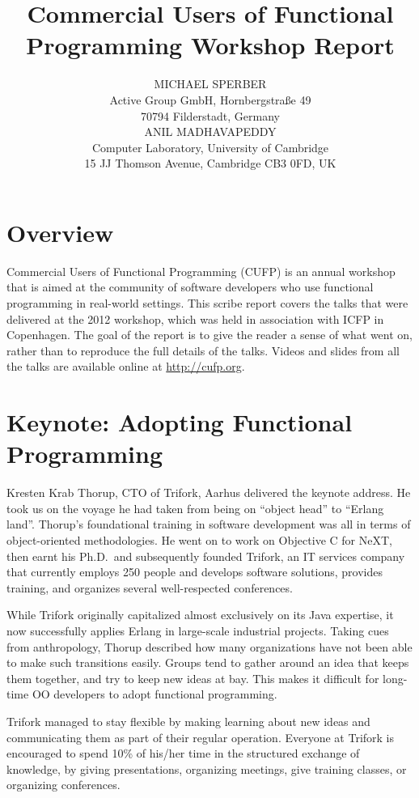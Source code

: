 \documentclass{jfp1}
\title[Commercial Users of Functional Programming 2012]
      {Commercial Users of Functional Programming Workshop Report}
\author[Michael Sperber and Anil Madhavapeddy]
       {MICHAEL SPERBER\\
         Active Group GmbH, Hornbergstra\ss{}e 49\\
         70794 Filderstadt, Germany\\
         ANIL MADHAVAPEDDY\\
        Computer Laboratory, University of Cambridge\\ 
        15 JJ Thomson Avenue, Cambridge CB3 0FD, UK}
\begin{document}
\label{firstpage}
\maketitle

\section{Overview}

Commercial Users of Functional Programming (CUFP) is an annual workshop
that is aimed at the community of software developers who use functional
programming in real-world settings.  This scribe report covers the talks
that were delivered at the 2012 workshop, which was held in association
with ICFP in Copenhagen.  The goal of the report is to give the reader
a sense of what went on, rather than to reproduce the full details
of the talks.  Videos and slides from all the talks are available online at \url{http://cufp.org}.

\section{Keynote: Adopting Functional Programming}

Kresten Krab Thorup, CTO of Trifork, Aarhus delivered the keynote address.
He took us on the voyage he had taken from being on ``object head''
to ``Erlang land''.  Thorup's foundational training in software
development was all in terms of object-oriented methodologies.  He
went on to work on Objective C for NeXT, then earnt his Ph.D.\
and subsequently founded Trifork, an IT services company that currently
employs 250 people and develops software solutions, provides training, and
organizes several well-respected conferences.

While Trifork originally capitalized almost exclusively on its Java
expertise, it now successfully applies Erlang in large-scale
industrial projects.  Taking cues from
anthropology, Thorup described how many organizations have not been able to make such transitions
easily. Groups tend to gather around an idea that keeps them together,
and try to keep new ideas at bay.  This makes it difficult for
long-time OO developers to adopt functional programming.

Trifork managed to stay flexible by making learning about new ideas
and communicating them as part of their regular operation.  Everyone at
Trifork is encouraged to spend 10\% of his/her time in the structured
exchange of knowledge, by giving presentations, organizing meetings,
give training classes, or organizing conferences.
\end{document}
